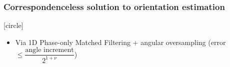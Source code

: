 \begin{frame}[noframenumbering]

  \frametitle{Correspondenceless solution to orientation estimation}


  \vspace{0.1cm}
  [circle]
  \begin{itemize}
    \item Via 1D Phase-only Matched Filtering + angular oversampling {\footnotesize (error $\leq \dfrac{\text{angle increment}}{2^{1+\nu}}$)}
  \end{itemize}
  \vspace{-0.25cm}

  \begin{center}
  \end{center}

\end{frame}
